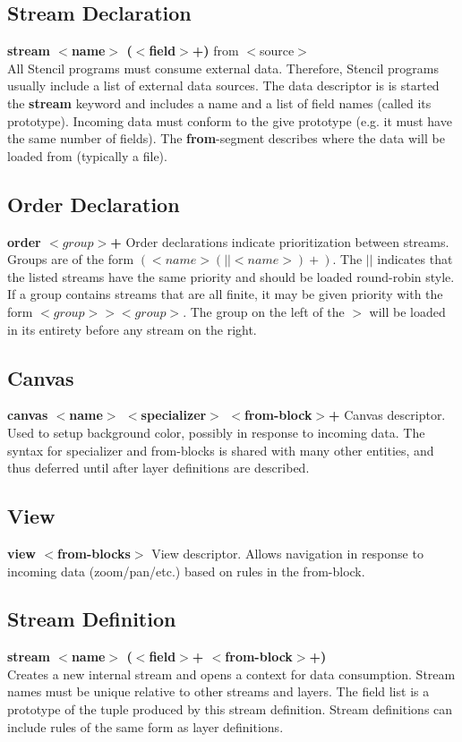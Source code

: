 \documentclass{article}
\begin{document}
\subsection{Stream Declaration}
\textbf{stream $<$name$>$ ($<$field$>$+)} from $<$source$>$\\
All Stencil programs must consume external data.
Therefore, Stencil programs usually include a list of external data sources.  
The data descriptor is is started the \textbf{stream} keyword and includes a name and a list of field names (called  its prototype).  
Incoming data must conform to the give prototype (e.g. it must have the same number of fields).
The \textbf{from}-segment describes where the data will be loaded from (typically a file).

\subsection{Order Declaration}
\textbf{order $<group>$+}
Order declarations indicate prioritization between streams.
Groups are of the form $(<name> (|| <name>)+)$.  The $||$ indicates that
the listed streams have the same priority and should be loaded round-robin style.
If a  group contains streams that are all finite, it may be given priority with the form  $<group> > <group>$.
The group on the left of the $>$ will be loaded in its entirety before any stream on the right.


\subsection{Canvas}
\textbf{canvas $<$name$>$ $<$specializer$>$ $<$from-block$>$+}
Canvas descriptor. Used to setup background color, possibly in response to incoming data.
The syntax for specializer and from-blocks is shared with many other entities, and thus deferred until after layer definitions are described.


\subsection{View}
\textbf{view $<$from-blocks$>$}
View descriptor. Allows navigation in response to incoming data (zoom/pan/etc.) based on rules in the from-block.


\subsection{Stream Definition}
\textbf{stream $<$name$>$ ($<$field$>$+ $<$from-block$>$+)}\\
Creates a new internal stream and opens a context for data consumption.
Stream names must be unique relative to other streams and layers.
The field list is a prototype of the tuple produced by this stream definition.
Stream definitions can include rules of the same form as layer definitions.
\end{document}
